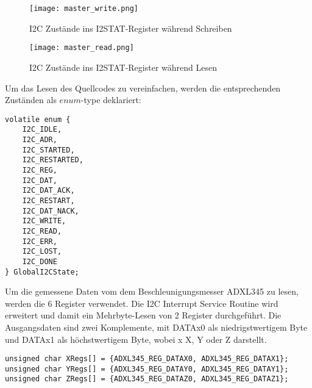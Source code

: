 \begin{figure}[!ht]
	\centering
	\texttt{[image: master\_write.png]}
	\caption[I2STAT-Register während Schreiben]{I2C Zustände ins I2STAT-Register während Schreiben}
	\label{fig:master_write}
\end{figure}
\begin{figure}[!ht]
	\centering
	\texttt{[image: master\_read.png]}
	\caption[I2STAT-Register während Lesen]{I2C Zustände ins I2STAT-Register während Lesen}
	\label{fig:master_read}
\end{figure}
\clearpage

Um das Lesen des Quellcodes zu vereinfachen, werden die entsprechenden Zuständen als $enum$-type deklariert:
\begin{lstlisting}
volatile enum {
	I2C_IDLE,
	I2C_ADR,
	I2C_STARTED,
	I2C_RESTARTED,
	I2C_REG,
	I2C_DAT,
	I2C_DAT_ACK,
	I2C_RESTART,
	I2C_DAT_NACK,
	I2C_WRITE,
	I2C_READ,
	I2C_ERR,
	I2C_LOST,
	I2C_DONE
} GlobalI2CState;
\end{lstlisting}

Um die gemessene Daten vom dem Beschleunigungsmesser ADXL345 zu lesen, werden die 6  Register verwendet. Die I2C Interrupt Service Routine wird erweitert und damit ein Mehrbyte-Lesen von 2 Register durchgeführt. Die Ausgangsdaten sind zwei Komplemente, mit DATAx0 als niedrigstwertigem Byte und DATAx1 als höchstwertigem Byte, wobei x X, Y oder Z darstellt. 
\begin{lstlisting}
unsigned char XRegs[] = {ADXL345_REG_DATAX0, ADXL345_REG_DATAX1};
unsigned char YRegs[] = {ADXL345_REG_DATAY0, ADXL345_REG_DATAY1};
unsigned char ZRegs[] = {ADXL345_REG_DATAZ0, ADXL345_REG_DATAZ1};
\end{lstlisting}
	

